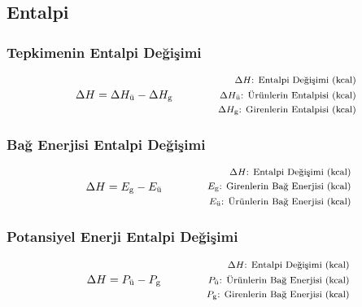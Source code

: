 \subsection{Entalpi}

\subsubsection*{Tepkimenin Entalpi Değişimi}
\begin{equation}
    \Delta H = \Delta H_\text{ü} - \Delta H_\text{g} \qquad \qquad \parbox{4cm}{\footnotesize$\begin{aligned}
        \Delta H\text{: Entalpi Değişimi (kcal)} \\
        \Delta H_\text{ü}\text{: Ürünlerin Entalpisi (kcal)} \\
        \Delta H_\text{g}\text{: Girenlerin Entalpisi (kcal)}
    \end{aligned}$}
\end{equation}

\subsubsection*{Bağ Enerjisi Entalpi Değişimi}
\begin{equation}
    \Delta H = E_\text{g} - E_\text{ü} \qquad \qquad \parbox{4cm}{\footnotesize$\begin{aligned}
        \Delta H\text{: Entalpi Değişimi (kcal)} \\
        E_\text{g}\text{: Girenlerin Bağ Enerjisi (kcal)} \\
        E_\text{ü}\text{: Ürünlerin Bağ Enerjisi (kcal)}
\end{aligned}$}
\end{equation}

\subsubsection*{Potansiyel Enerji Entalpi Değişimi}
\begin{equation}
    \Delta H = P_\text{ü} - P_\text{g} \qquad \qquad \parbox{4cm}{\footnotesize$\begin{aligned}
        \Delta H\text{: Entalpi Değişimi (kcal)} \\
        P_\text{ü}\text{: Ürünlerin Bağ Enerjisi (kcal)} \\
        P_\text{g}\text{: Girenlerin Bağ Enerjisi (kcal)}
\end{aligned}$}
\end{equation}